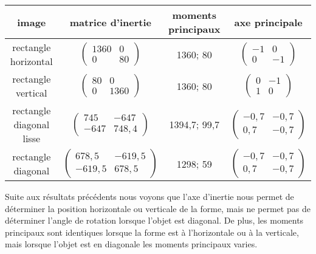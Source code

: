 \documentclass{article}
\begin{document}
  \begin{center}
    \begin{tabular}{|c|c|c|c|}
      \hline
      \textbf{image} & \textbf{matrice d'inertie} & \textbf{moments principaux} & \textbf{axe principale} \\
      \hline
      rectangle horizontal & $\begin{pmatrix}
			      1360 & 0 \\
			      0 & 80 
			      \end{pmatrix}$ 
			  & 1360; 80
			  &  $\begin{pmatrix}
			      -1 & 0 \\
			      0 & -1 
			      \end{pmatrix}$\\
      \hline
      rectangle vertical & $\begin{pmatrix}
			      80 & 0 \\
			      0 & 1360 
			      \end{pmatrix}$
			  & 1360; 80
			  &  $\begin{pmatrix}
			      0 & -1 \\
			      1 & 0 
			      \end{pmatrix}$\\
      \hline
      rectangle diagonal lisse & $\begin{pmatrix}
			      745 & -647 \\
			      -647 & 748,4 
			      \end{pmatrix}$
			  & 1394,7; 99,7
			  &  $\begin{pmatrix}
			      -0,7 & -0,7 \\
			      0,7 & -0,7 
			      \end{pmatrix}$\\
      \hline
      rectangle diagonal & $\begin{pmatrix}
			      678,5 & -619,5 \\
			      -619,5 & 678,5 
			      \end{pmatrix}$
			  & 1298; 59
			  &  $\begin{pmatrix}
			      -0,7 & -0,7 \\
			      0,7 & -0,7 
			      \end{pmatrix}$\\
      \hline
    \end{tabular}
  \end{center}
  
  Suite aux résultats précédents nous voyons que l'axe d'inertie nous permet de déterminer 
  la position horizontale ou verticale de la forme, mais ne permet pas de déterminer l'angle 
  de rotation lorsque l'objet est diagonal. De plus, les moments principaux sont identiques 
  lorsque la forme est à l'horizontale ou à la verticale, mais lorsque l'objet est en diagonale 
  les moments principaux varies.\\
  
\end{document}

